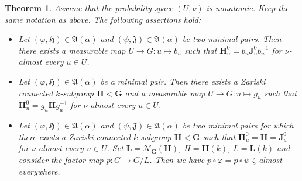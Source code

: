 \documentclass[11pt]{amsart}
\numberwithin{equation}{section}
\theoremstyle{plain}
\newtheorem{thm}{Theorem}[section]
\theoremstyle{definition}
\begin{document}
\begin{thm}\label{thm-product-algebraic}
Assume that the probability space $(U, \nu)$ is nonatomic. Keep the same notation as above. The following assertions hold:

\begin{itemize}
\item [$(\rm i)$] Let $(\varphi, \mathfrak H) \in \mathfrak A(\alpha)$ and $(\psi, \mathfrak J) \in \mathfrak A(\alpha)$ be two minimal pairs. Then there exists a measurable map $U \to G : u \mapsto b_u$ such that $\mathbf H_u^0 = b_u \mathbf J_u^0 b_u^{-1}$ for $\nu$-almost every $u \in U$.

\item [$(\rm ii)$] Let $(\varphi, \mathfrak H) \in \mathfrak A(\alpha)$ be a minimal pair. Then there exists a Zariski connected $k$-subgroup $\mathbf H < \mathbf G$ and a measurable map $U \to G : u \mapsto g_u$ such that $\mathbf H_u^0 = g_u \mathbf H g_u^{-1}$ for $\nu$-almost every $u \in U$.

\item [$(\rm iii)$] Let $(\varphi, \mathfrak H) \in \mathfrak A(\alpha)$ and $(\psi, \mathfrak J) \in \mathfrak A(\alpha)$ be two minimal pairs for which there exists a Zariski connected $k$-subgroup $\mathbf H < \mathbf G$ such that $\mathbf H_u^0 = \mathbf H = \mathbf J_u^0$ for $\nu$-almost every $u \in U$. Set $\mathbf L = \mathscr N_{\mathbf G}(\mathbf H)$, $H = \mathbf H(k)$, $L = \mathbf L(k)$ and consider the factor map $p : G \to G/L$. Then we have $p \circ \varphi = p \circ \psi$ $\zeta$-almost everywhere.
\end{itemize}
\end{thm}
\end{document}
